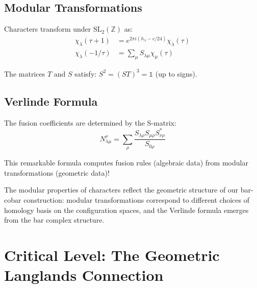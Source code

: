 \subsection{Modular Transformations}

\begin{theorem}
\label{thm:modular-transform-characters}
Characters transform under $\text{SL}_2(\mathbb{Z})$ as:
\begin{align}
\chi_\lambda(\tau + 1) &= e^{2\pi i(h_\lambda - c/24)}\chi_\lambda(\tau) \\
\chi_\lambda(-1/\tau) &= \sum_{\mu} S_{\lambda\mu} \chi_\mu(\tau)
\end{align}

The matrices $T$ and $S$ satisfy: $S^2 = (ST)^3 = \mathbb{1}$ (up to signs).
\end{theorem}

\subsection{Verlinde Formula}

\begin{theorem}
\label{thm:verlinde-formula}
The fusion coefficients are determined by the S-matrix:
$$N_{\lambda\mu}^\nu = \sum_{\rho} \frac{S_{\lambda\rho}S_{\mu\rho}S_{\nu\rho}^*}{S_{0\rho}}$$

This remarkable formula computes fusion rules (algebraic data) from modular transformations 
(geometric data)!
\end{theorem}

\begin{remark}
The modular properties of characters reflect the geometric structure of our bar-cobar 
construction: modular transformations correspond to different choices of homology basis 
on the configuration spaces, and the Verlinde formula emerges from the bar complex 
structure.
\end{remark}


\section{Critical Level: The Geometric Langlands Connection}
\label{sec:critical-level-geometric-langlands}

